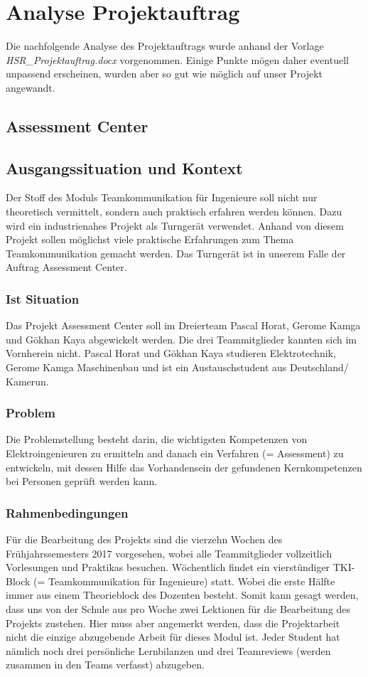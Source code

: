 \chapter{Analyse Projektauftrag}
Die nachfolgende Analyse des Projektauftrags wurde anhand der Vorlage \textit{HSR\_Projektauftrag.docx} vorgenommen. Einige Punkte mögen daher eventuell unpassend erscheinen, wurden aber so gut wie möglich auf unser Projekt angewandt.
\section*{Assessment Center}

\section{Ausgangssituation und Kontext}
Der Stoff des Moduls Teamkommunikation für Ingenieure soll nicht nur theoretisch vermittelt, sondern auch praktisch erfahren werden können. Dazu wird ein industrienahes Projekt als Turngerät verwendet. Anhand von diesem Projekt sollen möglichst viele praktische Erfahrungen zum Thema Teamkommunikation gemacht werden. Das Turngerät ist in unserem Falle der Auftrag Assessment Center.

\subsection{Ist Situation}
Das Projekt Assessment Center soll im Dreierteam Pascal Horat, Gerome Kamga und Gökhan Kaya abgewickelt werden. Die drei Teammitglieder kannten sich im Vornherein nicht. Pascal Horat und Gökhan Kaya studieren Elektrotechnik, Gerome Kamga Maschinenbau und ist ein Austauschstudent aus Deutschland/ Kamerun.

\subsection{Problem}
Die Problemstellung besteht darin, die wichtigsten Kompetenzen von Elektroingenieuren zu ermitteln and danach ein Verfahren (= Assessment) zu entwickeln, mit dessen Hilfe das Vorhandensein der gefundenen Kernkompetenzen bei Personen geprüft werden kann.
\subsection{Rahmenbedingungen}
Für die Bearbeitung des Projekts sind die vierzehn Wochen des Frühjahrssemesters 2017 vorgesehen, wobei alle Teammitglieder vollzeitlich Vorlesungen und Praktikas besuchen. Wöchentlich findet ein vierstündiger TKI-Block (= Teamkommunikation für Ingenieure) statt. Wobei die erste Hälfte immer aus einem Theorieblock des Dozenten besteht. Somit kann gesagt werden, dass uns von der Schule aus pro Woche zwei Lektionen für die Bearbeitung des Projekts zustehen. Hier muss aber angemerkt werden, dass die Projektarbeit nicht die einzige abzugebende Arbeit für dieses Modul ist. Jeder Student hat nämlich noch drei persönliche Lernbilanzen und drei Teamreviews (werden zusammen in den Teams verfasst) abzugeben. 
